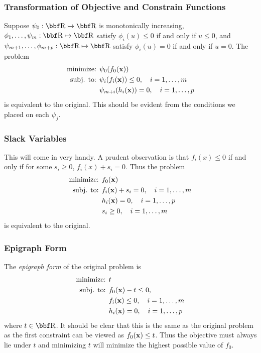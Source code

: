 \documentclass{article}
\begin{document}
\subsubsection{Transformation of Objective and Constrain Functions}

Suppose $\psi_0 : \RR \mapsto \RR$ is monotonically increasing, $\phi_1,\dots,
\psi_m : \RR \mapsto \RR$ satisfy $\phi_i(u) \leq 0$ if and only if $u \leq 0$,
and $\psi_{m+1},\dots,\phi_{m+p} : \RR\mapsto\RR$ satisfy $\phi_i(u)=0$ if and only
if $u=0$. The problem
\begin{align*}
    \text{minimize: } & \psi_0(f_0({\bf x}))\\
    \text{subj. to: } & \psi_i(f_i({\bf x})) \leq 0, \quad i=1,\dots,m\\
                      & \psi_{m+i}(h_i({\bf x})) = 0, \quad i=1,\dots,p
\end{align*}
is equivalent to the original. This should be evident from the conditions
we placed on each $\psi_j$.

\subsubsection{Slack Variables}

This will come in very handy. A prudent observation is that $f_i(x)\leq 0$
if and only if for some $s_i \geq 0$, $f_i(x) + s_i = 0$. Thus the problem
\begin{align*}
    \text{minimize: } & f_0({\bf x})\\
    \text{subj. to: } & f_i({\bf x}) + s_i = 0, \quad i=1,\dots,m\\
                      & h_i({\bf x}) = 0, \quad i=1,\dots,p\\
                      & s_i \geq 0, \quad i=1,\dots,m
\end{align*}
is equivalent to the original.

\subsubsection{Epigraph Form}

The \textit{epigraph form} of the original problem is
\begin{align*}
    \text{minimize: } & t\\
    \text{subj. to: } & f_0({\bf x}) - t \leq 0,\\
                      & f_i({\bf x}) \leq 0, \quad i=1,\dots,m\\
                      & h_i({\bf x}) = 0, \quad i=1,\dots,p
\end{align*}
where $t\in\RR$. It should be clear that this is the same as the original
problem as the first constraint can be viewed as $f_0({\bf x}) \leq t$. Thus
the objective must always lie under $t$ and minimizing $t$ will minimize the
highest possible value of $f_0$.
\end{document}
